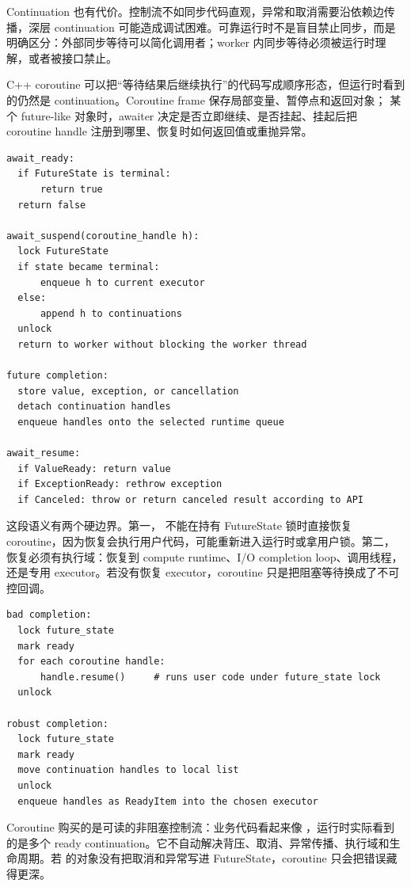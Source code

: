 Continuation 也有代价。控制流不如同步代码直观，异常和取消需要沿依赖边传播，深层 continuation 可能造成调试困难。可靠运行时不是盲目禁止同步，而是明确区分：外部同步等待可以简化调用者；worker 内同步等待必须被运行时理解，或者被接口禁止。

C++ coroutine 可以把“等待结果后继续执行”的代码写成顺序形态，但运行时看到的仍然是 continuation。Coroutine frame 保存局部变量、暂停点和返回对象； 某个 future-like 对象时，awaiter 决定是否立即继续、是否挂起、挂起后把 coroutine handle 注册到哪里、恢复时如何返回值或重抛异常。

\begin{lstlisting}[numbers=none,caption={future-like awaiter 的运行时语义}]
await_ready:
  if FutureState is terminal:
      return true
  return false

await_suspend(coroutine_handle h):
  lock FutureState
  if state became terminal:
      enqueue h to current executor
  else:
      append h to continuations
  unlock
  return to worker without blocking the worker thread

future completion:
  store value, exception, or cancellation
  detach continuation handles
  enqueue handles onto the selected runtime queue

await_resume:
  if ValueReady: return value
  if ExceptionReady: rethrow exception
  if Canceled: throw or return canceled result according to API
\end{lstlisting}

这段语义有两个硬边界。第一， 不能在持有 FutureState 锁时直接恢复 coroutine，因为恢复会执行用户代码，可能重新进入运行时或拿用户锁。第二，恢复必须有执行域：恢复到 compute runtime、I/O completion loop、调用线程，还是专用 executor。若没有恢复 executor，coroutine 只是把阻塞等待换成了不可控回调。

\begin{lstlisting}[numbers=none,caption={coroutine 和线程池集成的错误形态}]
bad completion:
  lock future_state
  mark ready
  for each coroutine handle:
      handle.resume()     # runs user code under future_state lock
  unlock

robust completion:
  lock future_state
  mark ready
  move continuation handles to local list
  unlock
  enqueue handles as ReadyItem into the chosen executor
\end{lstlisting}

Coroutine 购买的是可读的非阻塞控制流：业务代码看起来像 ，运行时实际看到的是多个 ready continuation。它不自动解决背压、取消、异常传播、执行域和生命周期。若  的对象没有把取消和异常写进 FutureState，coroutine 只会把错误藏得更深。

